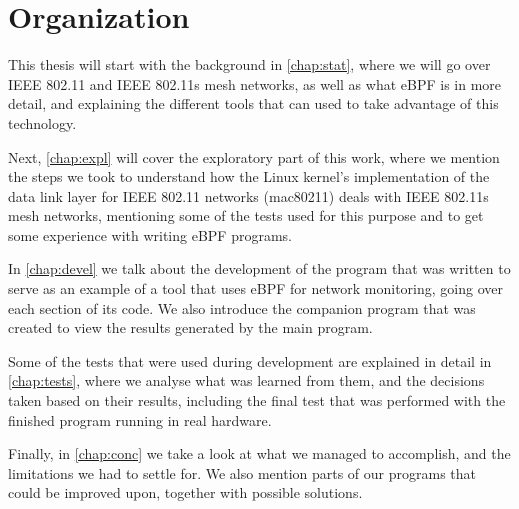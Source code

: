 \section{Organization}

This thesis will start with the background in \autoref{chap:stat}, where we will
go over \ac{IEEE} 802.11 and \ac{IEEE} 802.11s mesh networks, as well as what
eBPF is in more detail, and explaining the different tools that can used to take
advantage of this technology.

Next, \autoref{chap:expl} will cover the exploratory part of this work, where we
mention the steps we took to understand how the Linux kernel's implementation of
the data link layer for \ac{IEEE} 802.11 networks (mac80211) deals with
\ac{IEEE} 802.11s mesh networks, mentioning some of the tests used for this
purpose and to get some experience with writing eBPF programs.

In \autoref{chap:devel} we talk about the development of the program that was
written to serve as an example of a tool that uses eBPF for network monitoring,
going over each section of its code. We also introduce the companion program
that was created to view the results generated by the main program.

Some of the tests that were used during development are explained in detail in
\autoref{chap:tests}, where we analyse what was learned from them, and the
decisions taken based on their results, including the final test that was
performed with the finished program running in real hardware.

Finally, in \autoref{chap:conc} we take a look at what we managed to accomplish,
and the limitations we had to settle for. We also mention parts of our programs
that could be improved upon, together with possible solutions.
